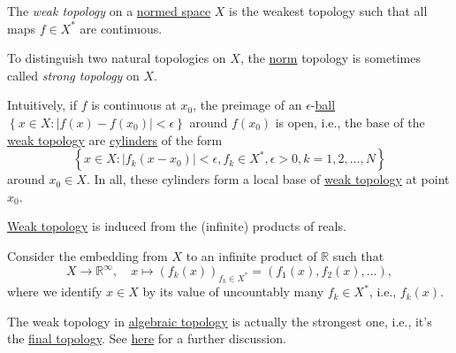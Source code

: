 \begin{definition}\label{def:weak-topology}
	The \emph{weak topology} on a \hyperref[def:normed-vector-space]{normed space} \(X\) is the weakest topology such that all maps \(f\in X^{\ast} \) are continuous.
\end{definition}

\begin{note}\label{note:strong-topology}
	To distinguish two natural topologies on \(X\), the \hyperref[def:norm]{norm} topology is sometimes called \emph{strong topology} on \(X\).
\end{note}

Intuitively, if \(f\) is continuous at \(x_0\), the preimage of an \(\epsilon \)-\hyperref[def:ball]{ball} \(\left\{ x\in X\colon \left\vert f(x) - f(x_0) \right\vert < \epsilon  \right\}\) around \(f(x_0)\) is open, i.e., the base of the \hyperref[def:weak-topology]{weak topology} are \href{https://en.wikipedia.org/wiki/Cylinder_set}{cylinders} of the form
\[
	\left\{ x\in X\colon \left\vert f_k(x - x_0) \right\vert < \epsilon ,f_k\in X^{\ast}, \epsilon > 0, k = 1, 2, \dots , N \right\}
\]
around \(x_0\in X\). In all, these cylinders form a local base of \hyperref[def:weak-topology]{weak topology} at point \(x_0\).

\begin{remark}
	\hyperref[def:weak-topology]{Weak topology} is induced from the (infinite) products of reals.
\end{remark}
\begin{explanation}
	Consider the embedding from \(X\) to an infinite product of \(\mathbb{R} \) such that
	\[
		X\to \mathbb{R} ^{\infty} ,
		\quad x\mapsto (f_k(x))_{f_k\in X^{\ast}} = (f_1(x), f_2(x), \dots ),
	\]
	where we identify \(x\in X\) by its value of uncountably many \(f_k\in X^{\ast} \), i.e., \(f_k(x)\).
\end{explanation}

\begin{note}
	The weak topology in \href{https://www.pbb.wtf/posts/Notes#algebraic-topology-math592-umich}{algebraic topology} is actually the strongest one, i.e., it's the \href{https://en.wikipedia.org/wiki/Final_topology}{final topology}. See \href{https://math.stackexchange.com/questions/921744/any-relations-between-the-weak-topology-on-a-banach-space-and-the-weak-topology}{here} for a further discussion.
\end{note}

